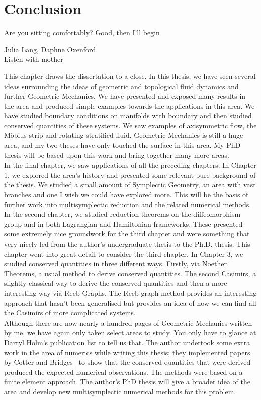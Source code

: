 
\chapter{Conclusion}
\epigraph{Are you sitting comfortably? Good, then I'll begin}{Julia Lang, Daphne Oxenford \\ Listen with mother}

\noindent
This chapter draws the dissertation to a close. In this thesis, we have seen several ideas surrounding the ideas of geometric and topological fluid dynamics and further Geometric Mechanics. We have presented and exposed many results in the area and produced simple examples towards the applications in this area. We have studied boundary conditions on manifolds with boundary and then studied conserved quantities of these systems. We saw examples of axisymmetric flow, the M\"obius strip and rotating stratified fluid. Geometric Mechanics is still a huge area, and my two theses have only touched the surface in this area. My PhD thesis will be based upon this work and bring together many more areas.\\

\noindent
In the final chapter, we saw applications of all the preceding chapters. In Chapter 1, we explored the area's history and presented some relevant pure background of the thesis. We studied a small amount of Symplectic Geometry, an area with vast branches and one I wish we could have explored more. This will be the basis of further work into multisymplectic reduction and the related numerical methods. In the second chapter, we studied reduction theorems on the diffeomorphism group and in both Lagrangian and Hamiltonian frameworks. These presented some extremely nice groundwork for the third chapter and were something that very nicely led from the author's undergraduate thesis to the Ph.D. thesis. This chapter went into great detail to consider the third chapter. In Chapter 3, we studied conserved quantities in three different ways. Firstly, via Noether Theorems, a usual method to derive conserved quantities. The second Casimirs, a slightly classical way to derive the conserved quantities and then a more interesting way via Reeb Graphs. The Reeb graph method provides an interesting approach that hasn't been generalised but provides an idea of how we can find all the Casimirs of more complicated systems.\\

\noindent
Although there are now nearly a hundred pages of Geometric Mechanics written by me, we have again only taken select areas to study. You only have to glance at Darryl Holm's publication list to tell us that. The author undertook some extra work in the area of numerics while writing this thesis; they implemented papers by Cotter and Bridges~\cite{cotter2005general,hamil_pdes} to show that the conserved quantities that were derived produced the expected numerical observations. The methods were based on a finite element approach. The author's PhD thesis will give a broader idea of the area and develop new multisymplectic numerical methods for this problem.\\

